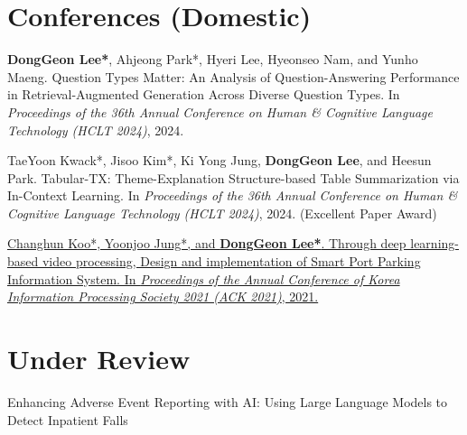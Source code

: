 \documentclass[letterpaper,11pt]{article}
\begin{document}
    \section{Conferences (Domestic)}
    \begin{enumerate}[noitemsep, leftmargin=*,label={[\arabic*]}]
        \item \textbf{DongGeon Lee*}, Ahjeong Park*, Hyeri Lee, Hyeonseo Nam, and Yunho Maeng. Question Types Matter: An Analysis of Question-Answering Performance in Retrieval-Augmented Generation Across Diverse Question Types. In \textit{Proceedings of the 36th Annual Conference on Human \& Cognitive Language Technology (HCLT 2024)}, 2024.
        \item TaeYoon Kwack*, Jisoo Kim*, Ki Yong Jung, \textbf{DongGeon Lee}, and Heesun Park. Tabular-TX: Theme-Explanation Structure-based Table Summarization via In-Context Learning. In \textit{Proceedings of the 36th Annual Conference on Human \& Cognitive Language Technology (HCLT 2024)}, 2024. (Excellent Paper Award)
        \item \href{https://doi.org/10.3745/PKIPS.y2021m11a.1342}{Changhun Koo*, Yoonjoo Jung*, and \textbf{DongGeon Lee*}. Through deep learning-based video processing, Design and implementation of Smart Port Parking Information System. In \textit{Proceedings of the Annual Conference of Korea Information Processing Society 2021 (ACK 2021)}, 2021.}
        
    \end{enumerate}

    
    \section{Under Review}
    \begin{enumerate}[noitemsep, leftmargin=*,label={[\arabic*]}]
        \item Enhancing Adverse Event Reporting with AI: Using Large Language Models to Detect Inpatient Falls
    \end{enumerate}
    

\end{document}
